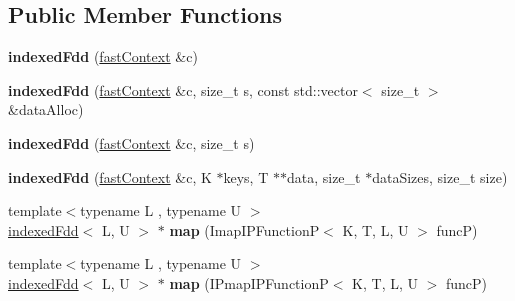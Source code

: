 \subsection*{Public Member Functions}
\begin{DoxyCompactItemize}
\item 
\hypertarget{classfaster_1_1indexedFdd_3_01K_00_01T_01_5_01_4_a87aee6dcc77e70ba4447d8bbc763c407}{}{\bfseries indexed\+Fdd} (\hyperlink{classfaster_1_1fastContext}{fast\+Context} \&c)\label{classfaster_1_1indexedFdd_3_01K_00_01T_01_5_01_4_a87aee6dcc77e70ba4447d8bbc763c407}

\item 
\hypertarget{classfaster_1_1indexedFdd_3_01K_00_01T_01_5_01_4_aec3fecef4bfa9f08895ed89045e8462a}{}{\bfseries indexed\+Fdd} (\hyperlink{classfaster_1_1fastContext}{fast\+Context} \&c, size\+\_\+t s, const std\+::vector$<$ size\+\_\+t $>$ \&data\+Alloc)\label{classfaster_1_1indexedFdd_3_01K_00_01T_01_5_01_4_aec3fecef4bfa9f08895ed89045e8462a}

\item 
\hypertarget{classfaster_1_1indexedFdd_3_01K_00_01T_01_5_01_4_a36bc7e44015d4d79ed35dbbea6d6ff98}{}{\bfseries indexed\+Fdd} (\hyperlink{classfaster_1_1fastContext}{fast\+Context} \&c, size\+\_\+t s)\label{classfaster_1_1indexedFdd_3_01K_00_01T_01_5_01_4_a36bc7e44015d4d79ed35dbbea6d6ff98}

\item 
\hypertarget{classfaster_1_1indexedFdd_3_01K_00_01T_01_5_01_4_a4e9372f28592b79a12659db3c0f0d725}{}{\bfseries indexed\+Fdd} (\hyperlink{classfaster_1_1fastContext}{fast\+Context} \&c, K $\ast$keys, T $\ast$$\ast$data, size\+\_\+t $\ast$data\+Sizes, size\+\_\+t size)\label{classfaster_1_1indexedFdd_3_01K_00_01T_01_5_01_4_a4e9372f28592b79a12659db3c0f0d725}

\item 
\hypertarget{classfaster_1_1indexedFdd_3_01K_00_01T_01_5_01_4_ac415b9ac120e7f41daae599b04ed4e9d}{}{\footnotesize template$<$typename L , typename U $>$ }\\\hyperlink{classfaster_1_1indexedFdd}{indexed\+Fdd}$<$ L, U $>$ $\ast$ {\bfseries map} (Imap\+I\+P\+Function\+P$<$ K, T, L, U $>$ func\+P)\label{classfaster_1_1indexedFdd_3_01K_00_01T_01_5_01_4_ac415b9ac120e7f41daae599b04ed4e9d}

\item 
\hypertarget{classfaster_1_1indexedFdd_3_01K_00_01T_01_5_01_4_a76632c9cc360bc0b0074a5d6d5a33fa9}{}{\footnotesize template$<$typename L , typename U $>$ }\\\hyperlink{classfaster_1_1indexedFdd}{indexed\+Fdd}$<$ L, U $>$ $\ast$ {\bfseries map} (I\+Pmap\+I\+P\+Function\+P$<$ K, T, L, U $>$ func\+P)\label{classfaster_1_1indexedFdd_3_01K_00_01T_01_5_01_4_a76632c9cc360bc0b0074a5d6d5a33fa9}


\end{DoxyCompactItemize}
